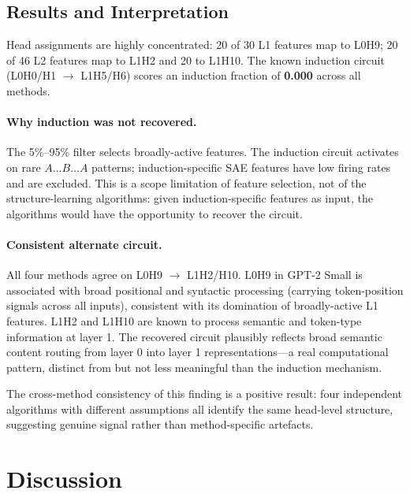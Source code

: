 \documentclass{article}
\begin{document}
\subsection{Results and Interpretation}

Head assignments are highly concentrated: 20 of 30 L1 features map to L0H9;
20 of 46 L2 features map to L1H2 and 20 to L1H10. The known induction circuit
(L0H0/H1 $\to$ L1H5/H6) scores an induction fraction of \textbf{0.000} across
all methods.

\paragraph{Why induction was not recovered.}
The 5\%--95\% filter selects broadly-active features. The induction circuit
activates on rare $A\ldots B\ldots A$ patterns; induction-specific SAE features
have low firing rates and are excluded. This is a scope limitation of feature
selection, not of the structure-learning algorithms: given induction-specific
features as input, the algorithms would have the opportunity to recover the
circuit.

\paragraph{Consistent alternate circuit.}
All four methods agree on L0H9 $\to$ L1H2/H10. L0H9 in GPT-2 Small is
associated with broad positional and syntactic processing (carrying
token-position signals across all inputs), consistent with its domination
of broadly-active L1 features. L1H2 and L1H10 are known to process semantic
and token-type information at layer 1. The recovered circuit plausibly
reflects broad semantic content routing from layer 0 into layer 1
representations---a real computational pattern, distinct from but not less
meaningful than the induction mechanism.

The cross-method consistency of this finding is a positive result: four
independent algorithms with different assumptions all identify the same
head-level structure, suggesting genuine signal rather than method-specific
artefacts.

\section{Discussion}
\end{document}
